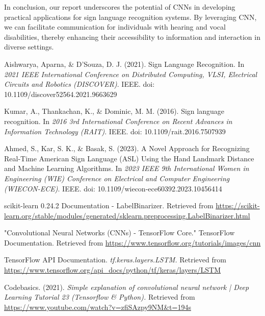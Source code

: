 \documentclass[conference]{IEEEtran}
\begin{document}
\vspace{\baselineskip}

In conclusion, our report underscores the potential of CNNs in developing practical applications for sign language recognition systems. By leveraging CNN, we can facilitate communication for individuals with hearing and vocal disabilities, thereby enhancing their accessibility to information and interaction in diverse settings.

\vspace{\baselineskip}

\begin{thebibliography}{00}

   Aishwarya, Aparna, \& D’Souza, D. J. (2021). Sign Language Recognition. In \textit{2021 IEEE International Conference on Distributed Computing, VLSI, Electrical Circuits and Robotics (DISCOVER)}. IEEE. doi: 10.1109/discover52564.2021.9663629
  
   Kumar, A., Thankachan, K., \& Dominic, M. M. (2016). Sign language recognition. In \textit{2016 3rd International Conference on Recent Advances in Information Technology (RAIT)}. IEEE. doi: 10.1109/rait.2016.7507939
  
   Ahmed, S., Kar, S. K., \& Basak, S. (2023). A Novel Approach for Recognizing Real-Time American Sign Language (ASL) Using the Hand Landmark Distance and Machine Learning Algorithms. In \textit{2023 IEEE 9th International Women in Engineering (WIE) Conference on Electrical and Computer Engineering (WIECON-ECE)}. IEEE. doi: 10.1109/wiecon-ece60392.2023.10456414
  
   scikit-learn 0.24.2 Documentation - LabelBinarizer. Retrieved from \url{https://scikit-learn.org/stable/modules/generated/sklearn.preprocessing.LabelBinarizer.html}
  
   "Convolutional Neural Networks (CNNs) - TensorFlow Core." TensorFlow Documentation. Retrieved from \url{https://www.tensorflow.org/tutorials/images/cnn}
  
   TensorFlow API Documentation. \textit{tf.keras.layers.LSTM.} Retrieved from \url{https://www.tensorflow.org/api_docs/python/tf/keras/layers/LSTM}
  
   Codebasics. (2021). \textit{Simple explanation of convolutional neural network | Deep Learning Tutorial 23 (Tensorflow \& Python).} Retrieved from \url{https://www.youtube.com/watch?v=zfiSAzpy9NM&t=194s}
  
\end{thebibliography}
\end{document}
